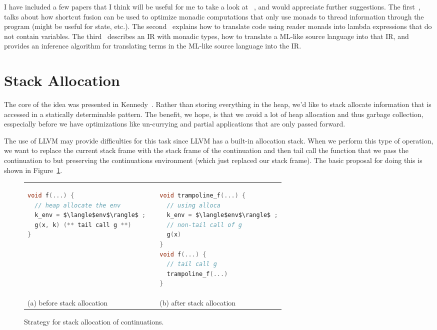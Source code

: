 \documentclass{article}
\begin{document}
I have included a few papers that I think will be useful for me to take a
look at
~\cite{ghani2007monadic,pudlak2011reader,tolmach1998optimizing}, and
would appreciate further suggestions. The
first~\cite{ghani2007monadic}, talks about how shortcut fusion can be
used to optimize monadic computations that only use monads to thread
information through the program (might be useful for state, etc.). The
second~\cite{pudlak2011reader} explains how to translate code using
reader monads into lambda expressions that do not contain variables. The
third~\cite{tolmach1998optimizing} describes an IR with monadic types,
how to translate a ML-like source language into that IR, and provides
an inference algorithm for translating terms in the ML-like source
language into the IR. 

\section{Stack Allocation}
\label{sec:stack-alloc}
The core of the idea was presented in Kennedy~\cite{kennedy07cps}. Rather than storing everything in the heap, we'd like to stack allocate information that is accessed in a statically determinable pattern. The benefit, we hope, is that we avoid a lot of heap allocation and thus garbage collection, esspecially before we have optimizations like un-currying and partial applications that are only passed forward.

The use of LLVM may provide difficulties for this task since LLVM has a built-in allocation stack. When we perform this type of operation, we want to replace the current stack frame with the stack frame of the continuation and then tail call the function that we pass the continuation to but preserving the continuations environment (which just replaced our stack frame). The basic proposal for doing this is shown in Figure~\ref{fig:stack-alloc}. 

\begin{figure}
\begin{tabular}{p{} c p{}}
\begin{lstlisting}[language=c]
void f(...) { 
  // heap allocate the env
  k_env = $\langle$env$\rangle$ ;
  g(x, k) (** tail call g **)
}
\end{lstlisting}
& \quad
& 
\begin{lstlisting}[language=c]
void trampoline_f(...) {
  // using alloca
  k_env = $\langle$env$\rangle$ ;
  // non-tail call of g
  g(x)
}
void f(...) {
  // tail call g
  trampoline_f(...)
}
\end{lstlisting}
\\
(a) before stack allocation & &
(b) after stack allocation \\ 
\end{tabular}
\caption{Strategy for stack allocation of continuations.}
\label{fig:stack-alloc}
\end{figure}
\end{document}
